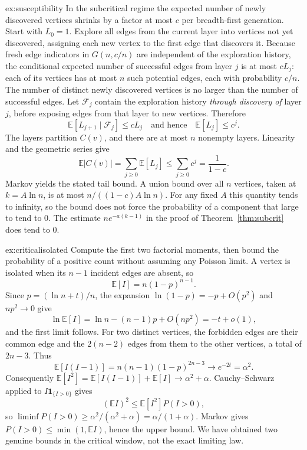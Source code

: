 \begin{solution}{ex:susceptibility}
\idea In the subcritical regime the expected number of newly discovered vertices shrinks by a factor at most $c$ per breadth-first generation.
\writeup Start with $L_0=1$. Explore all edges from the current layer into vertices not yet discovered, assigning each new vertex to the first edge that discovers it. Because fresh edge indicators in $G(n,c/n)$ are independent of the exploration history, the conditional expected number of successful edges from layer $j$ is at most $cL_j$: each of its vertices has at most $n$ such potential edges, each with probability $c/n$. The number of distinct newly discovered vertices is no larger than the number of successful edges. Let $\mathcal F_j$ contain the exploration history \emph{through discovery of} layer $j$, before exposing edges from that layer to new vertices. Therefore
\[
 \mathbb E[L_{j+1}\mid\mathcal F_j]\le cL_j
 \quad\text{and hence}\quad
 \mathbb E[L_j]\le c^j.
\]
The layers partition $C(v)$, and there are at most $n$ nonempty layers. Linearity and the geometric series give
\[
 \mathbb E|C(v)|=\sum_{j\ge0}\mathbb E[L_j]
 \le\sum_{j\ge0}c^j=\frac1{1-c}.
\]
Markov yields the stated tail bound. A union bound over all $n$ vertices, taken at $k=A\ln n$, is at most $n/((1-c)A\ln n)$. For any fixed $A$ this quantity tends to infinity, so the bound does not force the probability of a component that large to tend to $0$. The estimate $n e^{-a(k-1)}$ in the proof of Theorem~\ref{thm:subcrit} does tend to $0$.
\end{solution}

\begin{solution}{ex:criticalisolated}
\idea Compute the first two factorial moments, then bound the probability of a positive count without assuming any Poisson limit.
\writeup A vertex is isolated when its $n-1$ incident edges are absent, so
\[
 \mathbb E[I]=n(1-p)^{n-1}.
\]
Since $p=(\ln n+t)/n$, the expansion $\ln(1-p)=-p+O(p^2)$ and $np^2\to0$ give
\[
 \ln\mathbb E[I]=\ln n-(n-1)p+O(np^2)=-t+o(1),
\]
and the first limit follows. For two distinct vertices, the forbidden edges are their common edge and the $2(n-2)$ edges from them to the other vertices, a total of $2n-3$. Thus
\[
 \mathbb E[I(I-1)]=n(n-1)(1-p)^{2n-3}\longrightarrow e^{-2t}=\alpha^2.
\]
Consequently $\mathbb E[I^2]=\mathbb E[I(I-1)]+\mathbb E[I]\to\alpha^2+\alpha$. Cauchy--Schwarz applied to $I\mathbf1_{\{I>0\}}$ gives
\[
 (\mathbb E I)^2\le\mathbb E[I^2]P(I>0),
\]
so $\liminf P(I>0)\ge\alpha^2/(\alpha^2+\alpha)=\alpha/(1+\alpha)$. Markov gives $P(I>0)\le\min(1,\mathbb E I)$, hence the upper bound. We have obtained two genuine bounds in the critical window, not the exact limiting law.
\end{solution}

